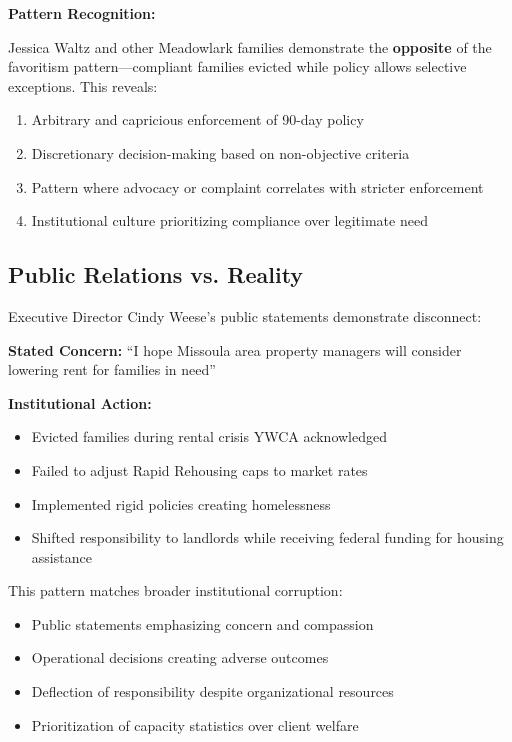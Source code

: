 \documentclass[12pt,oneside]{article}
\begin{document}
\textbf{Pattern Recognition:}

Jessica Waltz and other Meadowlark families demonstrate the \textbf{opposite} of the favoritism pattern---compliant families evicted while policy allows selective exceptions. This reveals:

\begin{enumerate}
\item Arbitrary and capricious enforcement of 90-day policy
\item Discretionary decision-making based on non-objective criteria
\item Pattern where advocacy or complaint correlates with stricter enforcement
\item Institutional culture prioritizing compliance over legitimate need
\end{enumerate}

\subsection*{Public Relations vs. Reality}

Executive Director Cindy Weese's public statements demonstrate disconnect:

\textbf{Stated Concern:} ``I hope Missoula area property managers will consider lowering rent for families in need''

\textbf{Institutional Action:}
\begin{itemize}
\item Evicted families during rental crisis YWCA acknowledged
\item Failed to adjust Rapid Rehousing caps to market rates
\item Implemented rigid policies creating homelessness
\item Shifted responsibility to landlords while receiving federal funding for housing assistance
\end{itemize}

This pattern matches broader institutional corruption:
\begin{itemize}
\item Public statements emphasizing concern and compassion
\item Operational decisions creating adverse outcomes
\item Deflection of responsibility despite organizational resources
\item Prioritization of capacity statistics over client welfare
\end{itemize}
\end{document}

